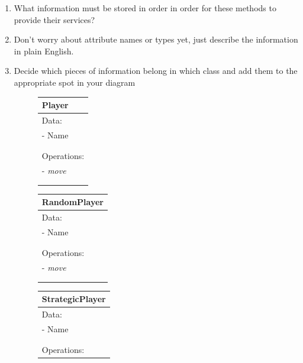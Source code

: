 \documentclass[12pt]{article}
\begin{document}
\begin{enumerate}[1.]
    \item What information must be stored in order in order for these methods to provide
    their services?
    \item Don’t worry about attribute names or types yet, just describe the information
    in plain English.
    \item Decide which pieces of information belong in which class and add them to the
    appropriate spot in your diagram

    \begin{figure}[H]
        \centering
        \begin{tabular}{|p{3.25cm}|}
            \hline
            \textbf{Player}\\
            \hline
            Data:\\
            - Name\\
            \\
            \\
            \hline
            Operations:\\
            - \textit{move} \\
            \\
            \\
            \hline
        \end{tabular}
        \begin{tabular}{|p{3.25cm}|}
            \hline
            \textbf{RandomPlayer}\\
            \hline
            Data:\\
            - Name\\
            \\
            \\
            \hline
            Operations:\\
            - \textit{move} \\
            \\
            \\
            \hline
        \end{tabular}
        \begin{tabular}{|p{3.25cm}|}
            \hline
            \textbf{StrategicPlayer}\\
            \hline
            Data:\\
            - Name\\
            \\
            \\
            \hline
            Operations:\\

\end{tabular}
\end{figure}
\end{enumerate}
\end{document}
